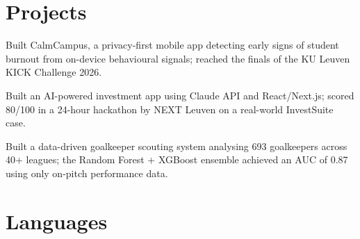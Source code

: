\section{Projects}

\begin{bullets}
    \item Built CalmCampus, a privacy-first mobile app detecting early signs of student burnout from on-device behavioural signals; reached the finals of the KU Leuven KICK Challenge 2026.
\end{bullets}

\begin{bullets}
    \item Built an AI-powered investment app using Claude API and React/Next.js; scored 80/100 in a 24-hour hackathon by NEXT Leuven on a real-world InvestSuite case.
\end{bullets}

\begin{bullets}
    \item Built a data-driven goalkeeper scouting system analysing 693 goalkeepers across 40+ leagues; the Random Forest + XGBoost ensemble achieved an AUC of 0.87 using only on-pitch performance data.
\end{bullets}

\section{Languages}

%
\contactsep%
%
\contactsep%
